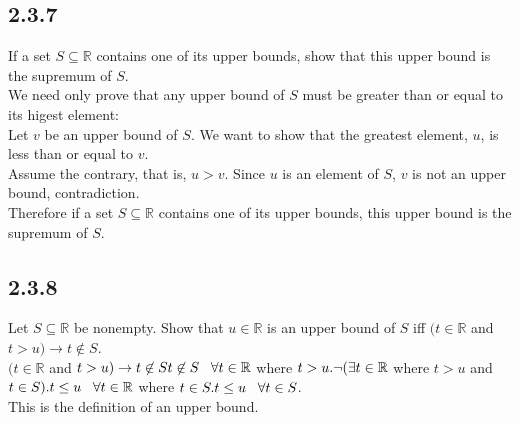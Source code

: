 \documentclass{article}
\begin{document}
\subsection{2.3.7}
If a set $S \subseteq \mathbb{R}$ contains one of its upper bounds, show that
this upper bound is the supremum of $S$.
\\We need only prove that any upper bound of $S$ must be greater than or
equal to its higest element:
\\Let $v$ be an upper bound of $S$. We want to show that the greatest
element, $u$, is less than or equal to $v$.
\\Assume the contrary, that is, $u > v$. Since $u$ is an element of $S$, $v$
is not an upper bound, contradiction.
\\Therefore if a set $S \subseteq \mathbb{R}$ contains one of its upper
bounds, this upper bound is the supremum of $S$.

\subsection{2.3.8}
Let $S \subseteq \mathbb{R}$ be nonempty. Show that $u \in \mathbb{R}$ is
an upper bound of $S$ iff $(t \in \mathbb{R}$ and $t > u)
\rightarrow t \not\in S$.
\\$(t \in \mathbb{R}$ and $t > u) \rightarrow t \not\in S
\\t \not\in S \;\;\; \forall t \in \mathbb{R}$ where $t > u.
\\\neg(\exists t \in \mathbb{R}$ where $t > u$ and $t \in S).
\\t \le u \;\;\; \forall t \in \mathbb{R}$ where $t \in S.
\\t \le u \;\;\; \forall t \in S$.
\\This is the definition of an upper bound.
\end{document}
